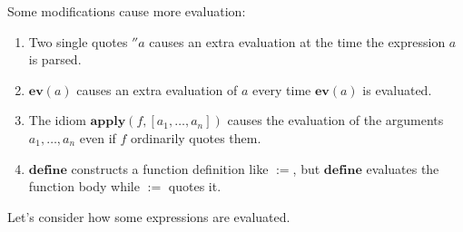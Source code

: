 \documentclass[12pt]{article}
\begin{document}
Some modifications cause more evaluation:

\begin{enumerate}
\item Two single quotes $''a$ causes an extra evaluation at the time the expression $a$ is parsed.
\item $\mathbf{ev}(a)$ causes an extra evaluation of $a$ every time $\mathbf{ev}(a)$ is evaluated.
\item The idiom $\mathbf{apply}(f, [a_1, \ldots, a_n])$ causes the evaluation
    of the arguments $a_1, \ldots, a_n$ even if $f$ ordinarily quotes them.
\item $\mathbf{define}$ constructs a function definition like $\mathbf{:=}$,
    but $\mathbf{define}$ evaluates the function body while $\mathbf{:=}$ quotes it.
\end{enumerate}

Let's consider how some expressions are evaluated.
\end{document}
